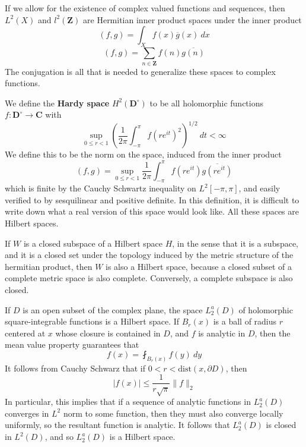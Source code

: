 \begin{example}
    If we allow for the existence of complex valued functions and sequences, then $L^2(X)$ and $l^2(\mathbf{Z})$ are Hermitian inner product spaces under the inner product
    \[ (f,g) = \int_X f(x) \overline{g}(x)\ dx \]
    \[ (f,g) = \sum_{n \in \mathbf{Z}} f(n) \overline{g(n)} \]
    The conjugation is all that is needed to generalize these spaces to complex functions.
\end{example}

\begin{example}
    We define the {\bf Hardy space} $H^2(\mathbf{D}^\circ)$ to be all holomorphic functions $f: \mathbf{D}^\circ \to \mathbf{C}$ with
    \[ \sup_{0 \leq r < 1} \left( \frac{1}{2\pi} \int_{-\pi}^\pi f(re^{it})^2 \right)^{1/2} \ dt < \infty \]
    We define this to be the norm on the space, induced from the inner product
    \[ (f,g) = \sup_{0 \leq r < 1} \frac{1}{2\pi} \int_{-\pi}^\pi f(re^{it}) \overline{g(re^{it})} \]
    which is finite by the Cauchy Schwartz inequality on $L^2[-\pi,\pi]$, and easily verified to by sesquilinear and positive definite. In this definition, it is difficult to write down what a real version of this space would look like. All these spaces are Hilbert spaces.
\end{example}

If $W$ is a closed subspace of a Hilbert space $H$, in the sense that it is a subspace, and it is a closed set under the topology induced by the metric structure of the hermitian product, then $W$ is also a Hilbert space, because a closed subset of a complete metric space is also complete. Conversely, a complete subspace is also closed.

\begin{example}
    If $D$ is an open subset of the complex plane, the space $L_2^a(D)$ of holomorphic square-integrable functions is a Hilbert space. If $B_r(x)$ is a ball of radius $r$ centered at $x$ whose closure is contained in $D$, and $f$ is analytic in $D$, then the mean value property guarantees that
    \[ f(x) = \fint_{B_r(x)} f(y)\ dy \]
    It follows from Cauchy Schwarz that if $0 < r < \text{dist}(x,\partial D)$, then
    \[ |f(x)| \leq \frac{1}{r\sqrt{\pi}} \|f \|_2 \]
    In particular, this implies that if a sequence of analytic functions in $L_2^a(D)$ converges in $L^2$ norm to some function, then they must also converge locally uniformly, so the resultant function is analytic. It follows that $L_2^a(D)$ is closed in $L^2(D)$, and so $L_2^a(D)$ is a Hilbert space.
\end{example}


